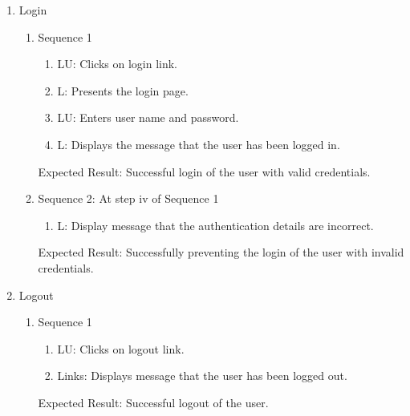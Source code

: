 \documentclass[11pt]{report} %
\begin{document}
\begin{enumerate}

\item
	Login
		\begin{enumerate}
			\item
				Sequence 1
					\begin{enumerate}
						\item
							LU: Clicks on login link.
						\item
							L: Presents the login page.
						\item
							LU: Enters user name and password.
						\item
							L: Displays the message that the user has been logged in.
					\end{enumerate}
					
			Expected Result: Successful login of the user with valid credentials.
			\item
				Sequence 2: At step iv of Sequence 1
					\begin{enumerate}
						\item
							L: Display message that the authentication details are incorrect.						
					\end{enumerate}
				Expected Result: Successfully preventing the login of the user with invalid credentials.
		\end{enumerate}

\item
	Logout
		\begin{enumerate}
			\item
				Sequence 1
					\begin{enumerate}
						\item
							LU: Clicks on logout link.
						\item
							Links: Displays message that the user has been logged out.			
					\end{enumerate}
				Expected Result: Successful logout of the user.
		\end{enumerate}


\end{enumerate}
\end{document}
